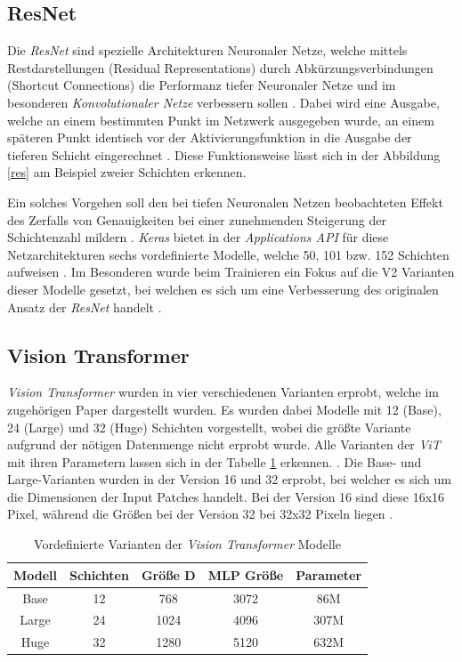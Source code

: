 \documentclass[twoside,a4paper]{IEEEtran}
\begin{document}
\subsection{ResNet} %
Die \emph{ResNet} sind spezielle Architekturen Neuronaler Netze, welche mittels Restdarstellungen (Residual Representations) durch Abkürzungsverbindungen (Shortcut Connections) die Performanz tiefer Neuronaler Netze und im besonderen \emph{Konvolutionaler Netze} verbessern sollen \cite[S.1-2]{resnet}. Dabei wird eine Ausgabe, welche an einem bestimmten Punkt im Netzwerk ausgegeben wurde, an einem späteren Punkt identisch vor der Aktivierungsfunktion in die Ausgabe der tieferen Schicht eingerechnet \cite[S.4]{resnet}. Diese Funktionsweise lässt sich in der Abbildung \ref{res} am Beispiel zweier Schichten erkennen.

Ein solches Vorgehen soll den bei tiefen Neuronalen Netzen beobachteten Effekt des Zerfalls von Genauigkeiten bei einer zunehmenden Steigerung der Schichtenzahl mildern \cite[S.1]{resnet}. \emph{Keras} bietet in der \emph{Applications API} für diese Netzarchitekturen sechs vordefinierte Modelle, welche 50, 101 bzw. 152 Schichten aufweisen \cite{resnet_keras}. Im Besonderen wurde beim Trainieren ein Fokus auf die V2 Varianten dieser Modelle gesetzt, bei welchen es sich um eine Verbesserung des originalen Ansatz der \emph{ResNet} handelt \cite{resnetv2}.
\subsection{Vision Transformer} %
\emph{Vision Transformer} wurden in vier verschiedenen Varianten erprobt, welche im zugehörigen Paper dargestellt wurden. Es wurden dabei Modelle mit 12 (Base), 24 (Large) und 32 (Huge) Schichten vorgestellt, wobei die größte Variante aufgrund der nötigen Datenmenge nicht erprobt wurde. Alle Varianten der \emph{ViT} mit ihren Parametern lassen sich in der Tabelle \ref{vit_sizes} erkennen. \cite[S.5]{VIT}. Die Base- und Large-Varianten wurden in der Version 16 und 32 erprobt, bei welcher es sich um die Dimensionen der Input Patches handelt. Bei der Version 16 sind diese 16x16 Pixel, während die Größen bei der Version 32 bei 32x32 Pixeln liegen \cite[S.5]{VIT}. 

\begin{table}[!htb]
	\caption{Vordefinierte Varianten der \emph{Vision Transformer} Modelle \cite[S.5]{VIT}}
	\label{vit_sizes}
	\centering
	\begin{tabular}{|c|c|c|c|c|}
		\hline
		Modell & Schichten & Größe D & MLP Größe & Parameter\\
		\hline
		\hline
		Base & 12 & 768 & 3072 & 86M\\
		\hline
		Large & 24 & 1024 & 4096 & 307M\\
		\hline
		Huge & 32 & 1280 & 5120 & 632M\\
		\hline 
	\end{tabular}
\end{table}
\end{document}
